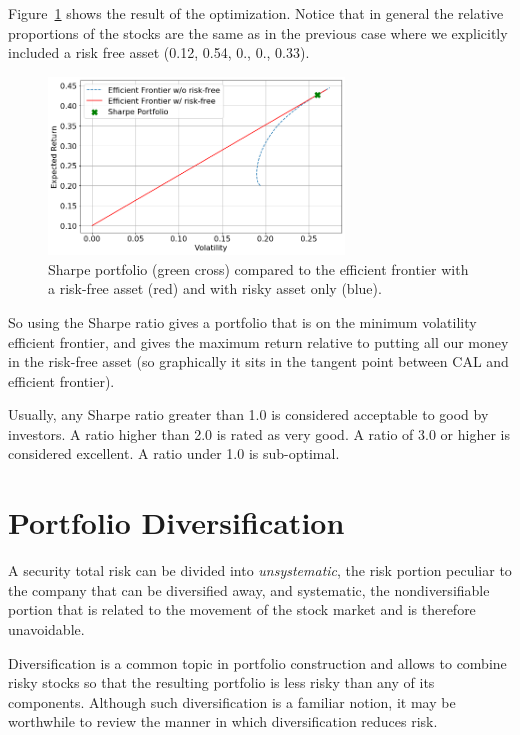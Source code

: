 Figure~\ref{fig:sharpe_ratio} shows the result of the optimization. Notice that in general the relative proportions of the stocks are the same as in the previous case where we explicitly included a risk free asset (0.12, 0.54, 0., 0., 0.33).

\begin{figure}[htb]
	\centering
	\includegraphics[width=0.7\textwidth]{figures/sharpe_ratio}
	\caption{Sharpe portfolio (green cross) compared to the efficient frontier with a risk-free asset (red) and with risky asset only (blue).}
	\label{fig:sharpe_ratio}
\end{figure}

So using the Sharpe ratio gives a portfolio that is on the minimum volatility efficient frontier, and gives the maximum return relative to putting all our money in the risk-free asset (so graphically it sits in the tangent point between CAL and efficient frontier).

Usually, any Sharpe ratio greater than 1.0 is considered acceptable to good by investors. A ratio higher than 2.0 is rated as very good. A ratio of 3.0 or higher is considered excellent. A ratio under 1.0 is sub-optimal.

\section{Portfolio Diversification}

A security total risk can be divided into \emph{unsystematic}, the risk portion peculiar to the company that can be diversified away, and systematic, the nondiversifiable portion that is related to the movement of the stock market and is therefore unavoidable. 

Diversification is a common topic in portfolio construction and allows to combine risky stocks so that the resulting portfolio is less risky than any of its components. Although such diversification is a familiar notion, it may be worthwhile to review the manner in which diversification reduces risk.

